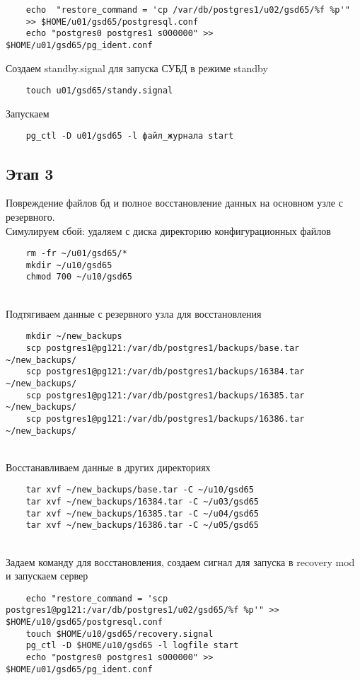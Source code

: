 \documentclass{article}
\begin{document}
\begin{verbatim}
    echo  "restore_command = 'cp /var/db/postgres1/u02/gsd65/%f %p'" 
    >> $HOME/u01/gsd65/postgresql.conf
    echo "postgres0 postgres1 s000000" >> $HOME/u01/gsd65/pg_ident.conf 
\end{verbatim}
Создаем standby.signal для запуска СУБД в режиме standby
\begin{verbatim}
    touch u01/gsd65/standy.signal
\end{verbatim}
Запускаем
\begin{verbatim}
    pg_ctl -D u01/gsd65 -l файл_журнала start
\end{verbatim}

\subsection{Этап 3}
Повреждение файлов бд и полное восстановление данных на основном узле с резервного. \\
Симулируем сбой: удаляем с диска директорию конфигурационных файлов
\begin{verbatim}
    rm -fr ~/u01/gsd65/*
    mkdir ~/u10/gsd65
    chmod 700 ~/u10/gsd65
\end{verbatim} \\
Подтягиваем данные с резервного узла для восстановления
\begin{verbatim}
    mkdir ~/new_backups
    scp postgres1@pg121:/var/db/postgres1/backups/base.tar ~/new_backups/
    scp postgres1@pg121:/var/db/postgres1/backups/16384.tar ~/new_backups/
    scp postgres1@pg121:/var/db/postgres1/backups/16385.tar ~/new_backups/
    scp postgres1@pg121:/var/db/postgres1/backups/16386.tar ~/new_backups/
\end{verbatim} \\
Восстанавливаем данные в других директориях
\begin{verbatim}
    tar xvf ~/new_backups/base.tar -C ~/u10/gsd65
    tar xvf ~/new_backups/16384.tar -C ~/u03/gsd65
    tar xvf ~/new_backups/16385.tar -C ~/u04/gsd65
    tar xvf ~/new_backups/16386.tar -C ~/u05/gsd65
\end{verbatim} \\
Задаем команду для восстановления, создаем сигнал для запуска в recovery mod и запускаем сервер
\begin{verbatim}
    echo "restore_command = 'scp postgres1@pg121:/var/db/postgres1/u02/gsd65/%f %p'" >> $HOME/u10/gsd65/postgresql.conf
    touch $HOME/u10/gsd65/recovery.signal
    pg_ctl -D $HOME/u10/gsd65 -l logfile start
    echo "postgres0 postgres1 s000000" >> $HOME/u01/gsd65/pg_ident.conf 
\end{verbatim}
\end{document}
